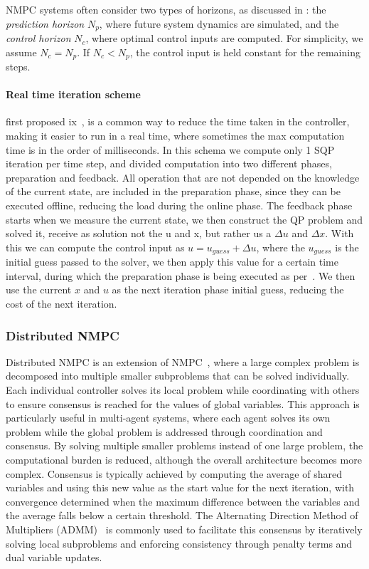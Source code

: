 NMPC systems often consider two types of horizons, as discussed in \cite{schwenzer2021review}: the \textit{prediction horizon} \( N_p \), where future system dynamics are simulated, and the \textit{control horizon} \( N_c \), where optimal control inputs are computed. For simplicity, we assume \( N_c = N_p \). If \( N_c < N_p \), the control input is held constant for the remaining steps.

\paragraph{Real time iteration scheme} first proposed ix~\cite{diehl2002real}, is a common way to reduce the time taken in the controller, making it easier to run in a real time, where sometimes the max computation time is in the order of milliseconds. In this schema we compute only 1 SQP iteration per time step, and divided computation into two different phases, preparation and feedback. All operation that are not depended on the knowledge of the current state, are included in the preparation phase, since they can be executed offline, reducing the load during the online phase. The feedback phase starts when we measure the current state, we then construct the QP problem and solved it, receive as solution not the u and x, but rather us a $\Delta u$ and $\Delta x$. With this we can compute the control input as $u = u_{guess} + \Delta u$, where the $u_{guess}$ is the initial guess passed to the solver, we then apply this value for a certain time interval, during which the preparation phase is being executed as per~\cite{diehl2005real}. We then use the current $x$ and $u$ as the next iteration phase initial guess, reducing the cost of the next iteration. 

\subsubsection{Distributed NMPC}

Distributed NMPC is an extension of NMPC~\cite{muller2013distributed}, where a large complex problem is decomposed into multiple smaller subproblems that can be solved individually. Each individual controller solves its local problem while coordinating with others to ensure consensus is reached for the values of global variables. This approach is particularly useful in multi-agent systems, where each agent solves its own problem while the global problem is addressed through coordination and consensus. By solving multiple smaller problems instead of one large problem, the computational burden is reduced, although the overall architecture becomes more complex. Consensus is typically achieved by computing the average of shared variables and using this new value as the start value for the next iteration, with convergence determined when the maximum difference between the variables and the average falls below a certain threshold. The Alternating Direction Method of Multipliers (ADMM)~\cite{boyd2011distributed} is commonly used to facilitate this consensus by iteratively solving local subproblems and enforcing consistency through penalty terms and dual variable updates.